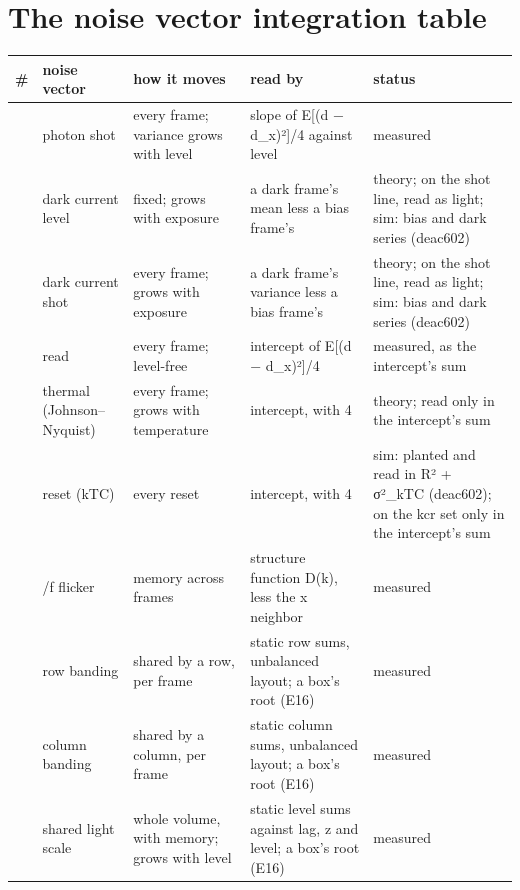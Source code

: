 \chapter{\texorpdfstring{The noise vector integration table}{The noise vector integration table}}
\label{chap:noise-vector-integration-table}

{\footnotesize
\setlength{\tabcolsep}{6pt}
\begin{longtable}{>{\RaggedRight\arraybackslash}p{}>{\RaggedRight\arraybackslash}p{}>{\RaggedRight\arraybackslash}p{}>{\RaggedRight\arraybackslash}p{}>{\RaggedRight\arraybackslash}p{}}
\toprule
\# & noise vector & how it moves & read by & status \\
\midrule
\endhead
1 & photon shot & every frame; variance grows with level & slope of E[(d − d\_\allowbreak{}x)²]/4 against level & measured \\
2 & dark current level & fixed; grows with exposure & a dark frame's mean less a bias frame's & theory; on the shot line, read as light; sim: bias and dark series (deac602) \\
3 & dark current shot & every frame; grows with exposure & a dark frame's variance less a bias frame's & theory; on the shot line, read as light; sim: bias and dark series (deac602) \\
4 & read & every frame; level-free & intercept of E[(d − d\_\allowbreak{}x)²]/4 & measured, as the intercept's sum \\
5 & thermal (Johnson–Nyquist) & every frame; grows with temperature & intercept, with 4 & theory; read only in the intercept's sum \\
6 & reset (kTC) & every reset & intercept, with 4 & sim: planted and read in R² + σ²\_\allowbreak{}kTC (deac602); on the kcr set only in the intercept's sum \\
7 & 1/f flicker & memory across frames & structure function D(k), less the x neighbor & measured \\
8 & row banding & shared by a row, per frame & static row sums, unbalanced layout; a box's root (E16) & measured \\
9 & column banding & shared by a column, per frame & static column sums, unbalanced layout; a box's root (E16) & measured \\
10 & shared light scale & whole volume, with memory; grows with level & static level sums against lag, z and level; a box's root (E16) & measured \\

\end{longtable}}
